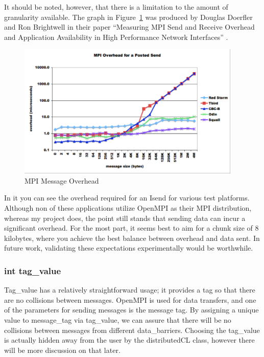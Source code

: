 \documentclass[../thesis.tex]{subfiles}
\begin{document}
      It should be noted, however, that there is a limitation to the amount of granularity available. The graph in Figure~\ref{fig:message_overhead} was produced by Douglas Doerfler and Ron Brightwell in their paper ``Measuring MPI Send and Receive Overhead and Application Availability in High Performance Network Interfaces'' \cite{mpioverhead}.

      \begin{figure}[htbp]
        \centering
        \includegraphics[width=0.95\textwidth]{diagrams/message_overhead.png}
        \caption{MPI Message Overhead}
        \label{fig:message_overhead}
      \end{figure}

    In it you can see the overhead required for an Isend for various test platforms. Although non of these applications utilize OpenMPI as their MPI distribution, whereas my project does, the point still stands that sending data can incur a significant overhead. For the most part, it seems best to aim for a chunk size of 8 kilobytes, where you achieve the best balance between overhead and data sent. In future work, validating these expectations experimentally would be worthwhile.

  \subsubsection{int tag\_value} %
  \label{ssub:int_tag_value}
    Tag\_value has a relatively straightforward usage; it provides a tag so that there are no collisions between messages. OpenMPI is used for data transfers, and one of the parameters for sending messages is the message tag. By assigning a unique value to message\_tag via tag\_value, we can assure that there will be no collisions between messages from different data\_barriers. Choosing the tag\_value is actually hidden away from the user by the distributedCL class, however there will be more discussion on that later.
\end{document}
